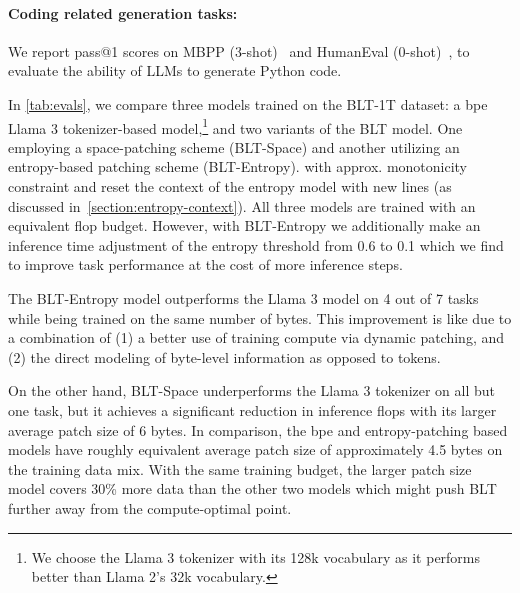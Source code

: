 \paragraph{Coding related generation tasks:}  We report pass@1 scores on MBPP (3-shot)~\citep{Eval_MBPP} and HumanEval (0-shot)~\citep{Eval_HumanEval}, to evaluate the ability of LLMs to generate Python code.

In \autoref{tab:evals}, we compare three models trained on the {\textsc BLT}-1T dataset: a bpe Llama 3 tokenizer-based model,\footnote{We choose the Llama 3 tokenizer with its 128k vocabulary as it performs better than Llama 2's 32k vocabulary.} and two variants of the {\textsc BLT} model. One employing a space-patching scheme ({\textsc BLT}-Space) and another utilizing an entropy-based patching scheme ({\textsc BLT}-Entropy). with approx. monotonicity constraint and reset the context of the entropy model with new lines (as discussed in~\autoref{section:entropy-context}). All three models are trained with an equivalent flop budget. However, with {\textsc BLT}-Entropy we additionally make an inference time adjustment of the entropy threshold from 0.6 to 0.1 which we find to improve task performance at the cost of more inference steps.

The {\textsc BLT}-Entropy model outperforms the Llama 3 model on 4 out of 7 tasks while being trained on the same number of bytes. This improvement is like due to a combination of (1) a better use of training compute via dynamic patching, and (2) the direct modeling of byte-level information as opposed to tokens.

On the other hand, {\textsc BLT}-Space underperforms the Llama 3 tokenizer on all but one task, but it achieves a significant reduction in inference flops with its larger average patch size of 6 bytes. In comparison, the bpe and entropy-patching based models have roughly equivalent average patch size of approximately 4.5 bytes on the training data mix. With the same training budget, the larger patch size model covers 30\% more data than the other two models which might push {\textsc BLT} further away from the compute-optimal point.

